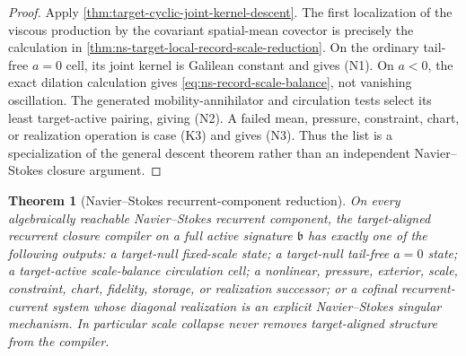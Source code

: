 \documentclass[11pt]{article}
\numberwithin{section}{part}
\theoremstyle{plain}
\newtheorem{theorem}{Theorem}[section]
\theoremstyle{definition}
\theoremstyle{remark}
\begin{document}
\begin{proof}
Apply \cref{thm:target-cyclic-joint-kernel-descent}.  The first localization
of the viscous production by the covariant spatial-mean covector is precisely
the calculation in
\cref{thm:ns-target-local-record-scale-reduction}.  On the ordinary
tail-free \(a=0\) cell, its joint kernel is Galilean constant and gives
\textup{(N1)}.  On \(a<0\), the exact dilation calculation gives
\eqref{eq:ns-record-scale-balance}, not vanishing oscillation.  The generated
mobility-annihilator and circulation tests select its least target-active
pairing, giving \textup{(N2)}.  A failed mean, pressure, constraint, chart, or realization
operation is case \textup{(K3)} and gives \textup{(N3)}.  Thus the list is a
specialization of the general descent theorem rather than an independent
Navier--Stokes closure argument.
\end{proof}

\begin{theorem}[Navier--Stokes recurrent-component reduction]
\label{thm:ns-recurrent-component-reduction}
On every algebraically reachable Navier--Stokes recurrent component, the
target-aligned recurrent closure compiler on a full active signature \(\mathfrak b\)
has exactly one of the following outputs: a target-null fixed-scale state; a
target-null tail-free \(a=0\) state; a target-active scale-balance circulation
cell; a nonlinear, pressure, exterior, scale, constraint, chart, fidelity,
storage, or realization successor; or a cofinal recurrent-current system whose diagonal realization
is an explicit Navier--Stokes singular mechanism.  In particular scale
collapse never removes target-aligned structure from the compiler.
\end{theorem}
\end{document}
